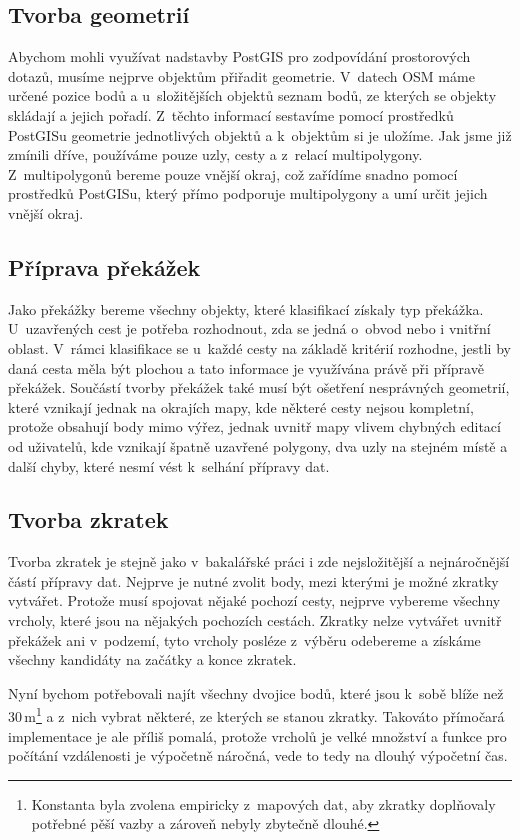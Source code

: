 \subsection{Tvorba geometrií}
Abychom mohli využívat nadstavby PostGIS pro zodpovídání prostorových dotazů,
musíme nejprve objektům přiřadit geometrie. V~datech OSM máme určené pozice bodů
a u~složitějších objektů seznam bodů, ze kterých se objekty skládají a jejich
pořadí. Z~těchto informací sestavíme pomocí prostředků PostGISu geometrie
jednotlivých objektů a k~objektům si je uložíme. Jak jsme již zmínili dříve,
používáme pouze uzly, cesty a z~relací multipolygony. Z~multipolygonů bereme
pouze vnější okraj, což zařídíme snadno pomocí prostředků PostGISu, který přímo
podporuje multipolygony a umí určit jejich vnější okraj.
 
\subsection{Příprava překážek}
Jako překážky bereme všechny objekty, které klasifikací získaly typ překážka.
U~uzavřených cest je potřeba rozhodnout, zda se jedná o~obvod nebo i vnitřní
oblast. V~rámci klasifikace se u~každé cesty na základě kritérií rozhodne,
jestli by daná cesta měla být plochou a tato informace je využívána právě při
přípravě překážek. Součástí tvorby překážek také musí být ošetření nesprávných
geometrií, které vznikají jednak na okrajích mapy, kde některé cesty nejsou
kompletní, protože obsahují body mimo výřez, jednak uvnitř mapy vlivem chybných
editací od uživatelů, kde vznikají špatně uzavřené polygony, dva uzly na stejném
místě a další chyby, které nesmí vést k~selhání přípravy dat.

\subsection{Tvorba zkratek}
Tvorba zkratek je stejně jako v~bakalářské práci i zde nejsložitější a
nejnáročnější částí přípravy dat. Nejprve je nutné zvolit body, mezi kterými je
možné zkratky vytvářet. Protože musí spojovat nějaké pochozí cesty, nejprve
vybereme všechny vrcholy, které jsou na nějakých pochozích cestách. Zkratky
nelze vytvářet uvnitř překážek ani v~podzemí, tyto vrcholy posléze z~výběru
odebereme a získáme všechny kandidáty na začátky a konce zkratek. 

Nyní bychom potřebovali najít všechny dvojice bodů, které jsou k~sobě blíže než
30\,m\footnote{Konstanta byla zvolena empiricky z~mapových dat, aby zkratky doplňovaly
potřebné pěší vazby a zároveň nebyly zbytečně dlouhé.} a z~nich vybrat některé,
ze kterých se stanou zkratky. Takováto přímočará implementace je ale příliš
pomalá, protože vrcholů je velké množství a funkce pro počítání vzdálenosti je
výpočetně náročná, vede to tedy na dlouhý výpočetní čas.

